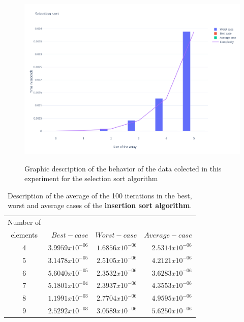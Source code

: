 \documentclass{article}
\begin{document}
\begin{figure}[htp]
	\centering
		\caption{Graphic description of the behavior of the data colected in this experiment for the selection sort algorithm}
	\includegraphics[width=\linewidth]{Selectionsort.png}
	\label{ima2}
\end{figure}

    \begin{table}[h!]
\centering
 \caption{Description of the average of the 100 iterations in the best, worst and average cases of the \textbf{insertion sort algorithm}. } 
 \label{ta5}
 \begin{tabular} {| c | r | r | r | }
 \hline
Number of 	&		&		&		\\
 elements	&		$	Best-case	$	&	$	Worst-case	$	&	$	Average -case	$	\\
 \hline
4	&	$	3.9959x10^{-06}	$	&	$	1.6856x10^{-06}	$	&	$	2.5314x10^{-06}	$	\\
\hline
5	&	$	3.1478x10^{-05}	$	&	$	2.5105x10^{-06}	$	&	$	4.2121x10^{-06}	$	\\
\hline
6	&	$	5.6040x10^{-05}	$	&	$	2.3532x10^{-06}	$	&	$	3.6283x10^{-06}	$	\\
\hline
7	&	$	5.1801x10^{-04}	$	&	$	2.3937x10^{-06}	$	&	$	4.3553x10^{-06}	$	\\
\hline
8	&	$	1.1991x10^{-03}	$	&	$	2.7704x10^{-06}	$	&	$	4.9595x10^{-06}	$	\\
\hline
9	&	$	2.5292x10^{-03}	$	&	$	3.0589x10^{-06}	$	&	$	5.6250x10^{-06}	$	\\
\hline
 \end{tabular}
 \end{table}
\end{document}
